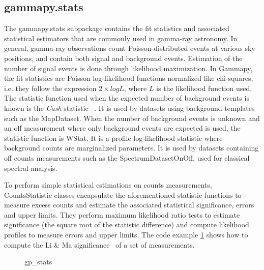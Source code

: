 \subsection{gammapy.stats}
\label{ssec:gammapy-stats}

The gammapy.stats subpackage contains the fit statistics and associated
statistical estimators that are commonly used in gamma-ray astronomy. In
general, gamma-ray observations count Poisson-distributed events at various sky
positions, and contain both signal and background events. Estimation of the
number of signal events is done through likelihood maximization. In Gammapy,
the fit statistics are Poisson log-likelihood functions normalized like
chi-squares, i.e. they follow the expression $2 \times log L$, where $L$ is the
likelihood function used. The statistic function used when the expected number
of background events is known is the \emph{Cash} statistic ~\citep{Cash}. It is
used by datasets using background templates such as the MapDataset. When the
number of background events is unknown and an off measurement where only
background events are expected is used, the statistic function is WStat. It is
a profile log-likelihood statistic where background counts are marginalized
parameters. It is used by datasets containing off counts measurements such as
the SpectrumDatasetOnOff, used for classical spectral analysis.

To perform simple statistical estimations on counts measurements,
CountsStatistic classes encapsulate the aforementioned statistic functions to
measure excess counts and estimate the associated statistical significance,
errors and upper limits. They perform maximum likelihood ratio tests to
estimate significance (the square root of the statistic difference) and compute
likelihood profiles to measure errors and upper limits. The code example
\ref{codeexample:stats} shows how to compute the Li \& Ma
significance~\citep{LiMa} of a set of measurements.

\begin{figure}
	{gp_stats}
	\caption{}
	\label{codeexample:stats} \end{figure}

